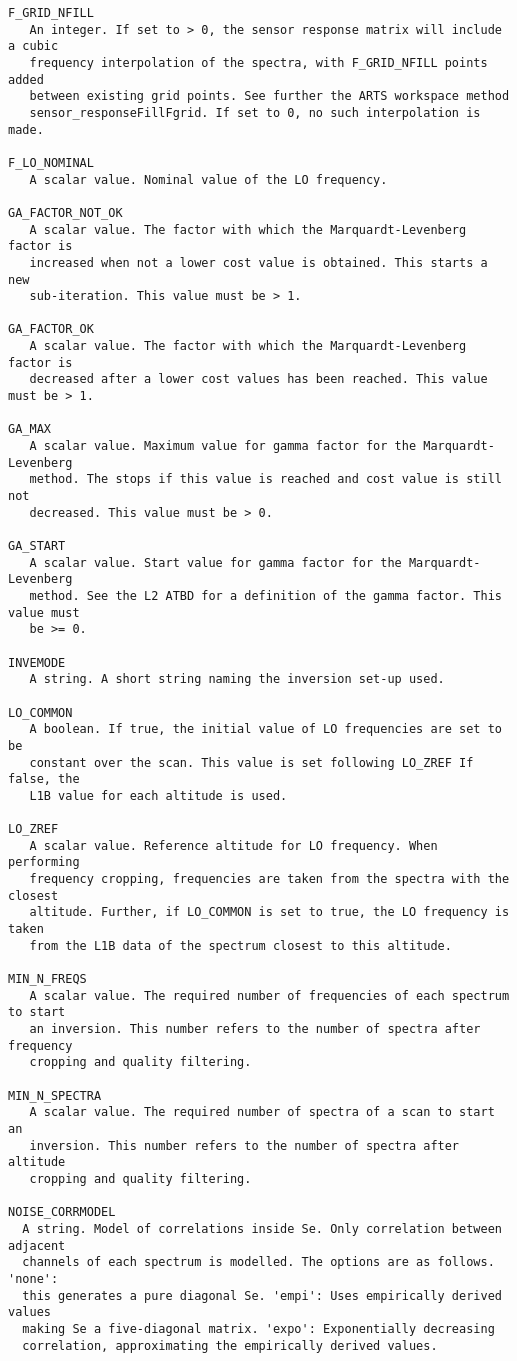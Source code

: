 \begin{verbatim}
F_GRID_NFILL
   An integer. If set to > 0, the sensor response matrix will include a cubic
   frequency interpolation of the spectra, with F_GRID_NFILL points added
   between existing grid points. See further the ARTS workspace method 
   sensor_responseFillFgrid. If set to 0, no such interpolation is made.

F_LO_NOMINAL
   A scalar value. Nominal value of the LO frequency.

GA_FACTOR_NOT_OK
   A scalar value. The factor with which the Marquardt-Levenberg factor is
   increased when not a lower cost value is obtained. This starts a new
   sub-iteration. This value must be > 1.

GA_FACTOR_OK
   A scalar value. The factor with which the Marquardt-Levenberg factor is
   decreased after a lower cost values has been reached. This value must be > 1.

GA_MAX          
   A scalar value. Maximum value for gamma factor for the Marquardt-Levenberg
   method. The stops if this value is reached and cost value is still not
   decreased. This value must be > 0.

GA_START
   A scalar value. Start value for gamma factor for the Marquardt-Levenberg
   method. See the L2 ATBD for a definition of the gamma factor. This value must
   be >= 0.

INVEMODE
   A string. A short string naming the inversion set-up used.

LO_COMMON
   A boolean. If true, the initial value of LO frequencies are set to be
   constant over the scan. This value is set following LO_ZREF If false, the 
   L1B value for each altitude is used.

LO_ZREF
   A scalar value. Reference altitude for LO frequency. When performing
   frequency cropping, frequencies are taken from the spectra with the closest
   altitude. Further, if LO_COMMON is set to true, the LO frequency is taken
   from the L1B data of the spectrum closest to this altitude.

MIN_N_FREQS
   A scalar value. The required number of frequencies of each spectrum to start
   an inversion. This number refers to the number of spectra after frequency
   cropping and quality filtering.

MIN_N_SPECTRA
   A scalar value. The required number of spectra of a scan to start an
   inversion. This number refers to the number of spectra after altitude
   cropping and quality filtering.

NOISE_CORRMODEL
  A string. Model of correlations inside Se. Only correlation between adjacent
  channels of each spectrum is modelled. The options are as follows. 'none':
  this generates a pure diagonal Se. 'empi': Uses empirically derived values
  making Se a five-diagonal matrix. 'expo': Exponentially decreasing
  correlation, approximating the empirically derived values.


\end{verbatim}
